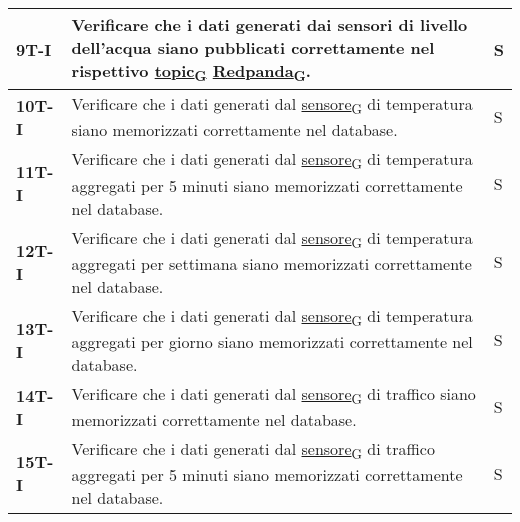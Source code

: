 \begin{longtable}{|>{\raggedright\arraybackslash}m{}|>{\raggedright\arraybackslash}m{}|>{\raggedright\arraybackslash}m{}|}
	\hline
	\textbf{9T-I}   & Verificare che i dati generati dai sensori di livello dell'acqua siano pubblicati correttamente nel rispettivo \href{https://7last.github.io/docs/rtb/documentazione-interna/glossario\#topic}{topic\textsubscript{G}} \href{https://7last.github.io/docs/pb/documentazione-interna/glossario\#redpanda}{Redpanda\textsubscript{G}}.                                                                                                    & S              \\
	\hline
	\textbf{10T-I}  & Verificare che i dati generati dal \href{https://7last.github.io/docs/rtb/documentazione-interna/glossario\#sensore}{sensore\textsubscript{G}} di temperatura siano memorizzati correttamente nel database.                                                                                                                         & S              \\
	\hline
	\textbf{11T-I}  & Verificare che i dati generati dal \href{https://7last.github.io/docs/rtb/documentazione-interna/glossario\#sensore}{sensore\textsubscript{G}} di temperatura aggregati per 5 minuti siano memorizzati correttamente nel database.                                                                                                  & S              \\
	\hline
	\textbf{12T-I}  & Verificare che i dati generati dal \href{https://7last.github.io/docs/rtb/documentazione-interna/glossario\#sensore}{sensore\textsubscript{G}} di temperatura aggregati per settimana siano memorizzati correttamente nel database.                                                                                                 & S              \\
	\hline
	\textbf{13T-I}  & Verificare che i dati generati dal \href{https://7last.github.io/docs/rtb/documentazione-interna/glossario\#sensore}{sensore\textsubscript{G}} di temperatura aggregati per giorno siano memorizzati correttamente nel database.                                                                                                    & S              \\
	\hline
	\textbf{14T-I}  & Verificare che i dati generati dal \href{https://7last.github.io/docs/rtb/documentazione-interna/glossario\#sensore}{sensore\textsubscript{G}} di traffico siano memorizzati correttamente nel database.                                                                                                                            & S              \\
	\hline
	\textbf{15T-I}  & Verificare che i dati generati dal \href{https://7last.github.io/docs/rtb/documentazione-interna/glossario\#sensore}{sensore\textsubscript{G}} di traffico aggregati per 5 minuti siano memorizzati correttamente nel database.                                                                                                     & S              \\

\end{longtable}
